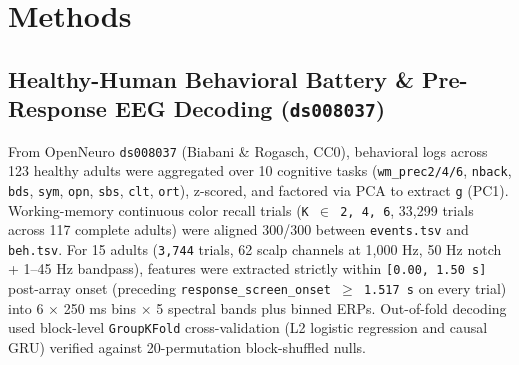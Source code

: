 \documentclass[11pt,a4paper]{article}
\begin{document}
\begin{abstract}
Third, to verify that these scaling laws persist inside a \textbf{biologically grounded whole-brain architecture}, we build a \textbf{100-region Functional Human Brain Emulator} anchored to real human CCEP-calibrated white matter (74 patients, \texttt{ds004080}), 19 PET neurotransmitter receptors (Hansen et al., 2022), 6-band HCP MEG timescales, and Mesulam hierarchy, filling in regional microcircuits with trainable E--I dynamics. Even \textbf{after} cognitive training on associative working memory plus 4-way executive rotation (\texttt{+0$^\circ$/+90$^\circ$/+180$^\circ$/+270$^\circ$}), the emulator maintains \textbf{triple real-human validity}: 74-patient invasive CCEP propagation (\textbf{\texttt{$\rho$ = +0.662}, partial \texttt{+0.378}} vs rewired control \texttt{$-$0.031}), zero-shot healthy-human non-invasive TMS-EEG across \textbf{46 clean adults} (\textbf{\texttt{+0.282--0.288}, \texttt{44--45/46 > 0}} vs rewired \texttt{+0.086}), and the 117-adult empirical working-memory cliff (beating rewired white matter by \texttt{+6.8} to \texttt{+15.0 pp}). Lifting one biological bottleneck at a time across 8 regimes (3 seeds each) proves that \textbf{only clean associative indexing} --- either an \textbf{Upgraded Hippocampal Index (\texttt{100.0\%} through $K = 8$, \texttt{87.2\%} at $K = 12$, \texttt{62.7\%} at unseen $K = 16$)} or a \textbf{4-bit "Region 101" Prosthetic Cortex attached to the unmodified noisy biological brain (\texttt{72.1\%} at $K = 12$ vs \texttt{30.6\%} baseline and \texttt{35.6\%} Sham; \texttt{+36.5 pp} over Sham)} --- breaks Cowan's wall, whereas pure denoising/neuromodulation (\texttt{27.3\%}), local PFC expansion (\texttt{19.1\%}), and \texttt{4$\times$} wider white-matter tracts (\texttt{36.7\%}) remain bounded at $K = 12\text{-}16$.

\end{abstract}
\section{Methods}
\subsection{Healthy-Human Behavioral Battery \& Pre-Response EEG Decoding (\texttt{ds008037})}
From OpenNeuro \texttt{ds008037} (Biabani \& Rogasch, CC0), behavioral logs across 123 healthy adults were aggregated over 10 cognitive tasks (\texttt{wm\_prec2/4/6}, \texttt{nback}, \texttt{bds}, \texttt{sym}, \texttt{opn}, \texttt{sbs}, \texttt{clt}, \texttt{ort}), z-scored, and factored via PCA to extract \texttt{g} (PC1). Working-memory continuous color recall trials (\texttt{K $\in$ {2, 4, 6}}, 33,299 trials across 117 complete adults) were aligned 300/300 between \texttt{events.tsv} and \texttt{beh.tsv}. For 15 adults (\texttt{3,744} trials, 62 scalp channels at 1,000 Hz, 50 Hz notch + 1--45 Hz bandpass), features were extracted strictly within \texttt{[0.00, 1.50 s]} post-array onset (preceding \texttt{response\_screen\_onset $\ge$ 1.517 s} on every trial) into 6 $\times$ 250 ms bins $\times$ 5 spectral bands plus binned ERPs. Out-of-fold decoding used block-level \texttt{GroupKFold} cross-validation (L2 logistic regression and causal GRU) verified against 20-permutation block-shuffled nulls.
\end{document}
